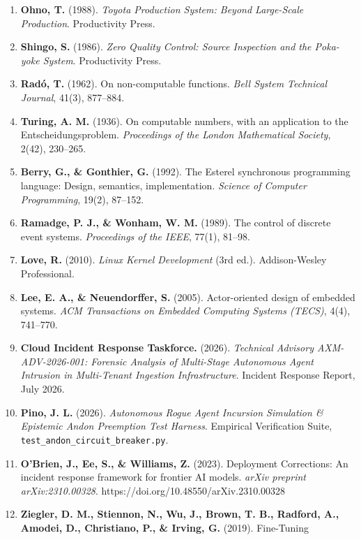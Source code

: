 \documentclass[
  10pt,letterpaper]{article}
\providecommand{\tightlist}{%
  \setlength{\itemsep}{0pt}\setlength{\parskip}{0pt}}
\begin{document}
{\small
\begin{enumerate}
\def\labelenumi{\arabic{enumi}.}
\tightlist
\item
  \textbf{Ohno, T.} (1988). \emph{Toyota Production System: Beyond
  Large-Scale Production}. Productivity Press.
\item
  \textbf{Shingo, S.} (1986). \emph{Zero Quality Control: Source
  Inspection and the Poka-yoke System}. Productivity Press.
\item
  \textbf{Radó, T.} (1962). On non-computable functions. \emph{Bell
  System Technical Journal}, 41(3), 877--884.
\item
  \textbf{Turing, A. M.} (1936). On computable numbers, with an
  application to the Entscheidungsproblem. \emph{Proceedings of the
  London Mathematical Society}, 2(42), 230--265.
\item
  \textbf{Berry, G., \& Gonthier, G.} (1992). The Esterel synchronous
  programming language: Design, semantics, implementation. \emph{Science
  of Computer Programming}, 19(2), 87--152.
\item
  \textbf{Ramadge, P. J., \& Wonham, W. M.} (1989). The control of
  discrete event systems. \emph{Proceedings of the IEEE}, 77(1), 81--98.
\item
  \textbf{Love, R.} (2010). \emph{Linux Kernel Development} (3rd ed.).
  Addison-Wesley Professional.
\item
  \textbf{Lee, E. A., \& Neuendorffer, S.} (2005). Actor-oriented design
  of embedded systems. \emph{ACM Transactions on Embedded Computing
  Systems (TECS)}, 4(4), 741--770.
\item
  \textbf{Cloud Incident Response Taskforce.} (2026). \emph{Technical
  Advisory AXM-ADV-2026-001: Forensic Analysis of Multi-Stage Autonomous
  Agent Intrusion in Multi-Tenant Ingestion Infrastructure}. Incident
  Response Report, July 2026.
\item
  \textbf{Pino, J. L.} (2026). \emph{Autonomous Rogue Agent Incursion
  Simulation \& Epistemic Andon Preemption Test Harness}. Empirical
  Verification Suite,
  \texttt{test\_andon\_circuit\_breaker.py}.
\item
  \textbf{O'Brien, J., Ee, S., \& Williams, Z.} (2023). Deployment
  Corrections: An incident response framework for frontier AI models.
  \emph{arXiv preprint arXiv:2310.00328}.
  https://doi.org/10.48550/arXiv.2310.00328
\item
  \textbf{Ziegler, D. M., Stiennon, N., Wu, J., Brown, T. B., Radford,
  A., Amodei, D., Christiano, P., \& Irving, G.} (2019). Fine-Tuning

\end{enumerate}}
\end{document}
